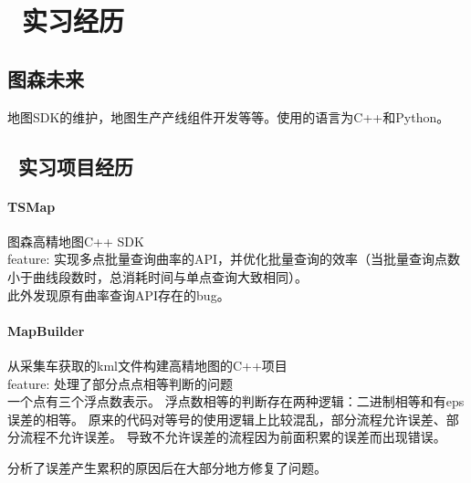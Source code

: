\documentclass{resume}
\begin{document}
    \section{\faUsers\ 实习经历}
        \subsection{图森未来} 
            地图SDK的维护，地图生产产线组件开发等等。使用的语言为C++和Python。
            
    \subsection{\faUsers\ 实习项目经历}
        \paragraph{TSMap} 图森高精地图C++ SDK\\
            feature: 实现多点批量查询曲率的API，并优化批量查询的效率（当批量查询点数小于曲线段数时，总消耗时间与单点查询大致相同）。\\
            此外发现原有曲率查询API存在的bug。
            
        \paragraph{MapBuilder} 从采集车获取的kml文件构建高精地图的C++项目\\
            feature: 处理了部分点点相等判断的问题\\
            一个点有三个浮点数表示。
            浮点数相等的判断存在两种逻辑：二进制相等和有eps误差的相等。
            原来的代码对等号的使用逻辑上比较混乱，部分流程允许误差、部分流程不允许误差。
            导致不允许误差的流程因为前面积累的误差而出现错误。
            
            分析了误差产生累积的原因后在大部分地方修复了问题。
\end{document}
